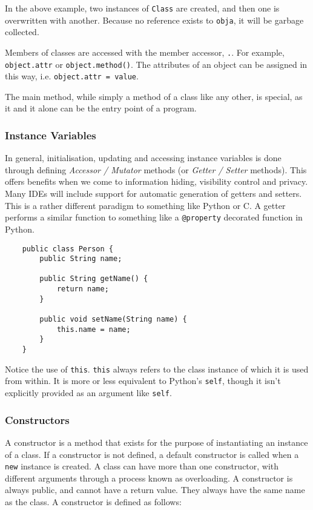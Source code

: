 \documentclass[12pt]{report}
\newcommand{\code}[1]{\lstinline{#1}}
\begin{document}
\begin{flushleft}
In the above example, two instances of \code{Class} are created, and then one
is overwritten with another. Because no reference exists to \code{obja}, it 
will be garbage collected. \par
Members of classes are accessed with the member accessor, \code{.}. For 
example, \code{object.attr} or \code{object.method()}. The attributes of an
object can be assigned in this way, i.e. \code{object.attr = value}.

\bigskip
The main method, while simply a method of a class like any other, is special, 
as it and it alone can be the entry point of a program.

\subsubsection*{Instance Variables}

In general, initialisation, updating and accessing instance variables is done
through defining \textit{Accessor / Mutator} methods (or 
\textit{Getter / Setter} methods). This offers benefits when we come to 
information hiding, visibility control and privacy. Many IDEs will include 
support for automatic generation of getters and setters. This is a rather 
different paradigm to something like Python or C. A getter performs a similar
function to something like a \code{@property} decorated function in Python.

\begin{lstlisting}
    public class Person {
        public String name;

        public String getName() {
            return name;
        }

        public void setName(String name) {
            this.name = name;
        }
    }
\end{lstlisting}

Notice the use of \code{this}. \code{this} always refers to the class instance
of which it is used from within. It is more or less equivalent to Python's 
\code{self}, though it isn't explicitly provided as an argument like 
\code{self}.

\subsubsection*{Constructors}

A constructor is a method that exists for the purpose of instantiating an 
instance of a class. If a constructor is not defined, a default constructor
is called when a \code{new} instance is created. A class can have more than
one constructor, with different arguments through a process known as 
overloading. A constructor is always public, and cannot have a return value.
They always have the same name as the class. A constructor is defined as 
follows:


\end{flushleft}
\end{document}
